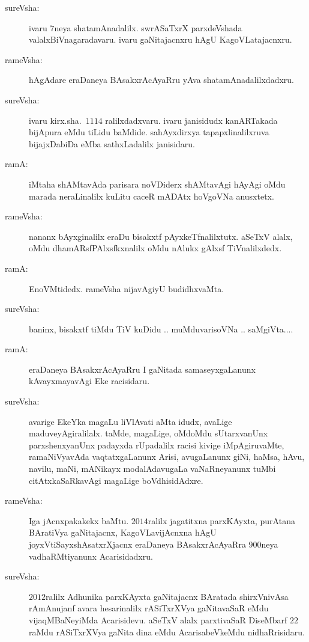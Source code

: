 \begin{description}
\item[sureVsha:] ivaru $7$neya shatamAnadalilx. swrASaTxrX parxdeVshada valalxBiVnagaradavaru. ivaru gaNitajacnxru hAgU KagoVLatajacnxru.

\item[rameVsha:] hAgAdare eraDaneya BAsakxrAcAyaRru yAva shatamAnadalilxdadxru.

\item[sureVsha:] ivaru kirx.sha.\ $1114$ ralilxdadxvaru. ivaru janisidudx kanARTakada bijApura eMdu tiLidu baMdide. sahAyxdirxya tapapxlinalilxruva bijajxDabiDa eMba sathxLadalilx janisidaru.

\item[ramA:] iMtaha shAMtavAda parisara noVDiderx shAMtavAgi hAyAgi oMdu marada neraLinalilx kuLitu caceR mADAtx hoVgoVNa anusxtetx.

\item[rameVsha:] nananx bAyxginalilx eraDu bisakxtf pAyxkeTfnalilxtutx. aSeTxV alalx, oMdu dhamARsfPAlxsfkxnalilx oMdu nAlukx gAlxsf TiVnalilxdedx.

\item[ramA:] EnoVMtidedx. rameVsha nijavAgiyU budidhxvaMta.

\item[sureVsha:] baninx, bisakxtf tiMdu TiV kuDidu .. muMduvarisoVNa .. saMgiVta....

\item[ramA:] eraDaneya BAsakxrAcAyaRru I gaNitada samaseyxgaLanunx kAvayxmayavAgi Eke racisidaru.

\item[sureVsha:] avarige EkeYka magaLu liVlAvati aMta idudx, avaLige maduveyAgiralilalx. taMde, magaLige, oMdoMdu sUtarxvanUnx parxshenxyanUnx padayxda rUpadalilx racisi kivige iMpAgiruvaMte, ramaNiVyavAda vaqtatxgaLanunx Arisi, avugaLanunx giNi, haMsa, hAvu, navilu, maNi, mANikayx modalAdavugaLa vaNaRneyanunx tuMbi citAtxkaSaRkavAgi magaLige boVdhisidAdxre.

\item[rameVsha:] Iga jAcnxpakakekx baMtu. $2014$ralilx jagatitxna parxKAyxta, purAtana BAratiVya gaNitajacnx, KagoVLavijAcnxna hAgU joyxVtiSayxshAsatxrXjacnx eraDaneya BAsakxrAcAyaRra $900$neya vadhaRMtiyanunx Acarisidadxru.

\item[sureVsha:] $2012$ralilx Adhunika parxKAyxta gaNitajacnx BAratada shirxVnivAsa rAmAnujanf avara hesarinalilx rASiTxrXVya gaNitavaSaR eMdu vijaqMBaNeyiMda Acarisidevu. aSeTxV alalx parxtivaSaR DiseMbarf $22$raMdu rASiTxrXVya gaNita dina eMdu AcarisabeVkeMdu nidhaRrisidaru.


\end{description}
